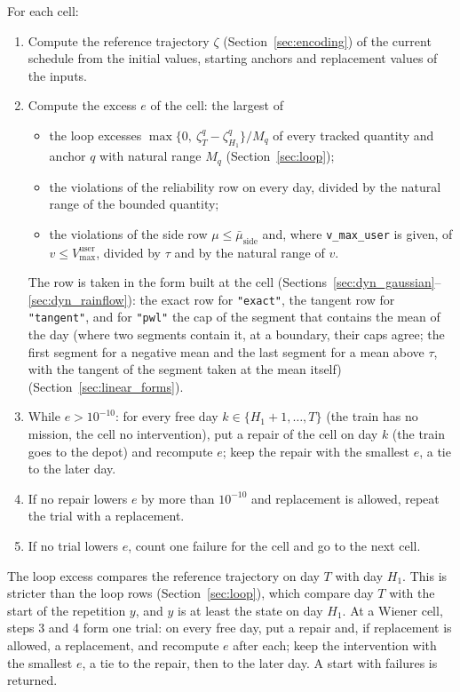 For each cell:
\begin{enumerate}[nosep,label=\arabic*.]
  \item Compute the reference trajectory $\zeta$ (Section~\ref{sec:encoding}) of the current schedule from the initial values, starting anchors and replacement values of the inputs.
  \item Compute the excess $e$ of the cell: the largest of
    \begin{itemize}[nosep]
      \item the loop excesses $\max\{0,\ \zeta^{q}_{T} - \zeta^{q}_{H_1}\}/M_q$ of every tracked quantity and anchor $q$ with natural range $M_q$ (Section~\ref{sec:loop});
      \item the violations of the reliability row on every day, divided by the natural range of the bounded quantity;
      \item the violations of the side row $\mu \le \bar\mu_{\mathrm{side}}$ and, where \texttt{v\_max\_user} is given, of $v \le V^{\mathrm{user}}_{\max}$, divided by $\tau$ and by the natural range of $v$.
    \end{itemize}
    The row is taken in the form built at the cell (Sections~\ref{sec:dyn_gaussian}--\ref{sec:dyn_rainflow}): the exact row for \texttt{"exact"}, the tangent row for \texttt{"tangent"}, and for \texttt{"pwl"} the cap of the segment that contains the mean of the day (where two segments contain it, at a boundary, their caps agree; the first segment for a negative mean and the last segment for a mean above $\tau$, with the tangent of the segment taken at the mean itself) (Section~\ref{sec:linear_forms}).
  \item While $e > 10^{-10}$: for every free day $k \in \{H_1+1,\ldots,T\}$ (the train has no mission, the cell no intervention), put a repair of the cell on day $k$ (the train goes to the depot) and recompute $e$; keep the repair with the smallest $e$, a tie to the later day.
  \item If no repair lowers $e$ by more than $10^{-10}$ and replacement is allowed, repeat the trial with a replacement.
  \item If no trial lowers $e$, count one failure for the cell and go to the next cell.
\end{enumerate}
The loop excess compares the reference trajectory on day $T$ with day $H_1$. This is stricter than the loop rows (Section~\ref{sec:loop}), which compare day $T$ with the start of the repetition $y$, and $y$ is at least the state on day $H_1$.
At a Wiener cell, steps 3 and 4 form one trial: on every free day, put a repair and, if replacement is allowed, a replacement, and recompute $e$ after each; keep the intervention with the smallest $e$, a tie to the repair, then to the later day.
A start with failures is returned.


